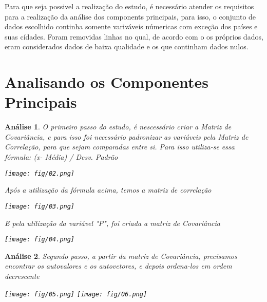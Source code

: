 \documentclass[11pt,a4paper]{article}
\newtheorem{2}{Análise}
\begin{document}
Para que seja possivel a realização do estudo, é necessário atender os requisitos para a realização da análise dos components principais, para isso, o conjunto de dados escolhido continha somente variváveis númericas com exceção dos países e suas cídades. Foram removidas linhas no qual, de acordo com o os próprios dados, eram considerados dados de baixa qualidade e os que continham dados nulos.


\section{Analisando os Componentes Principais}

\begin{2} \normalfont O primeiro passo do estudo, é nescessário criar a Matriz de Covariância, e para isso foi necessário padronizar as variáveis pela Matriz de Correlação, para  que sejam comparadas entre si. Para isso utiliza-se essa fórmula: (x- Média) / Desv. Padrão

\begin{center}
    \texttt{[image: fig/02.png]}
\end{center}

Após a utilização da fórmula acima, temos a matriz de correlação\\

\begin{center}
    \texttt{[image: fig/03.png]}
\end{center}

E pela utilização da variável "P", foi criada a matriz de Covariância\\

\begin{center}
    \texttt{[image: fig/04.png]}
\end{center}
\end{2}

\begin{2} \normalfont Segundo passo, a partir da matriz de Covariância, precisamos encontrar os autovalores e os autovetores, e depois ordena-los em ordem decrescente

\begin{center}
    \texttt{[image: fig/05.png]}
    \texttt{[image: fig/06.png]}
\end{center}
\end{2}
\end{document}
